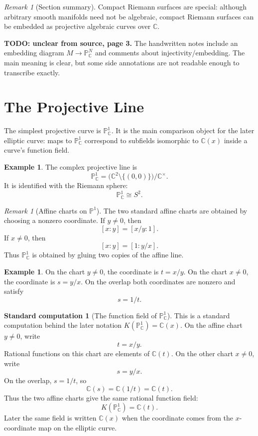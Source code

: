 \documentclass[11pt]{article}
\theoremstyle{definition}
\newtheorem{example}[theorem]{Example}
\newtheorem{calculation}[theorem]{Standard computation}
\theoremstyle{remark}
\newtheorem{remark}[theorem]{Remark}
\newcommand{\C}{\mathbb{C}}
\newcommand{\Pj}{\mathbb{P}}
\newcommand{\K}{K}
\newcommand{\sourceunclear}[2]{%
  \par\smallskip
  \noindent\textbf{TODO: unclear from source, page #1.} #2
  \par\smallskip
}
\begin{document}
\begin{remark}[Section summary]
Compact Riemann surfaces are special: although arbitrary smooth manifolds need
not be algebraic, compact Riemann surfaces can be embedded as projective
algebraic curves over \(\C\).
\end{remark}

\sourceunclear{3}{The handwritten notes include an embedding diagram
\(M\to \Pj^N_{\C}\) and comments about injectivity/embedding.  The main meaning
is clear, but some side annotations are not readable enough to transcribe
exactly.}

\section{The Projective Line}

The simplest projective curve is \(\Pj^1_{\C}\).  It is the main comparison
object for the later elliptic curve: maps to \(\Pj^1_{\C}\) correspond to
subfields isomorphic to \(\C(x)\) inside a curve's function field.

\begin{example}
The complex projective line is
\[
  \Pj^1_{\C}
  =
  \bigl(\C^2\setminus\{(0,0)\}\bigr)\big/{\C^\times}.
\]
It is identified with the Riemann sphere:
\[
  \Pj^1_{\C}\cong S^2.
\]
\end{example}

\begin{remark}[Affine charts on \(\Pj^1\)]
The two standard affine charts are obtained by choosing a nonzero coordinate.
If \(y\neq 0\), then
\[
  [x:y]=[x/y:1].
\]
If \(x\neq 0\), then
\[
  [x:y]=[1:y/x].
\]
Thus \(\Pj^1_{\C}\) is obtained by gluing two copies of the affine line.
\end{remark}

\begin{example}
On the chart \(y\neq 0\), the coordinate is \(t=x/y\).  On the chart
\(x\neq 0\), the coordinate is \(s=y/x\).  On the overlap both coordinates
are nonzero and satisfy
\[
  s=1/t.
\]
\end{example}

\begin{calculation}[The function field of \(\Pj^1_{\C}\)]
This is a standard computation behind the later notation
\(\K(\Pj^1_{\C})=\C(x)\).  On the affine chart \(y\neq 0\), write
\[
  t=x/y.
\]
Rational functions on this chart are elements of \(\C(t)\).  On the other
chart \(x\neq 0\), write
\[
  s=y/x.
\]
On the overlap, \(s=1/t\), so
\[
  \C(s)=\C(1/t)=\C(t).
\]
Thus the two affine charts give the same rational function field:
\[
  \K(\Pj^1_{\C})=\C(t).
\]
Later the same field is written \(\C(x)\) when the coordinate comes from the
\(x\)-coordinate map on the elliptic curve.
\end{calculation}
\end{document}
